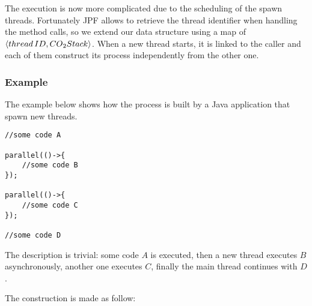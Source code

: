 The execution is now more complicated due to the scheduling of the spawn threads. Fortunately JPF allows to retrieve the thread identifier when handling the method calls, so we extend our data structure using a map of $\langle thread\, ID, CO\textsubscript{2}{}Stack\rangle$. When a new thread starts, it is linked to the caller and each of them construct its \coco process independently from the other one.  

\subsubsection{Example}
The example below shows how the \coco process is built by a Java application that spawn new threads.

\begin{mdframed}
\begin{verbatim}
//some code A

parallel(()->{
    //some code B
});

parallel(()->{
    //some code C
});

//some code D
\end{verbatim}
\end{mdframed}

The description is trivial: some code $A$ is executed, then a new thread executes $B$ asynchronously, another one executes $C$, finally the main thread continues with $D$.

The construction is made as follow:

